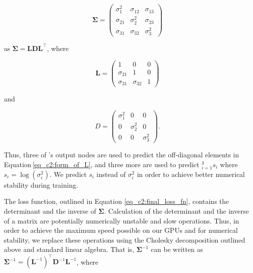 \begin{equation}
\boldsymbol{\Sigma} = \left(\begin{array}{ccc}
\sigma_{1}^{2} & \sigma_{12} & \sigma_{13} \\
\sigma_{21} & \sigma_{2}^{2} & \sigma_{23} \\
\sigma_{31} & \sigma_{32} & \sigma_{3}^{2}
\end{array}\right)
\label{eq_c2:full_sigma_matrix}
\end{equation}

\noindent
as $\boldsymbol{\Sigma} = \boldsymbol{L}\boldsymbol{D}\boldsymbol{L}^{\top}$, where 

\begin{equation}
\boldsymbol{L} = \left(\begin{array}{lll}
1 & 0 & 0 \\
\sigma_{21} & 1 & 0 \\
\sigma_{31} & \sigma_{32} & 1
\end{array}\right)
\label{eq_c2:form_of_L}
\end{equation}

\noindent
and 

\begin{equation}
D=\left(\begin{array}{ccc}
\sigma_{1}^{2} & 0 & 0 \\
0 & \sigma_{2}^{2} & 0 \\
0 & 0 & \sigma_{3}^{2}
\end{array}\right) .
\label{eq_c2:form_of_D}
\end{equation}

\noindent
Thus, three of \gampen{}'s output nodes are used to predict the off-diagonal elements in Equation\,\ref{eq_c2:form_of_L},
and three more are used to predict $_{i=1}^3s_i$ where $s_i=\log(\sigma_i^2)$. We predict $s_i$ instead of $\sigma_i^2$ in order to achieve better numerical stability during training. 

The loss function, outlined in Equation \ref{eq_c2:final_loss_fn}, contains the determinant and the inverse of $\boldsymbol{\Sigma}$. Calculation of the determinant and the inverse of a matrix are potentially numerically unstable and slow operations. Thus, in order to achieve the maximum speed possible on our GPUs and for numerical stability, we replace these operations using the Cholesky decomposition outlined above and standard linear algebra. 
That is, $\boldsymbol{\Sigma}^{-1}$ can be written as $\boldsymbol{\Sigma}^{-1}=\left(\boldsymbol{L}^{-1}\right)^{\top} \boldsymbol{D}^{-1} \boldsymbol{L}^{-1}$, where 


